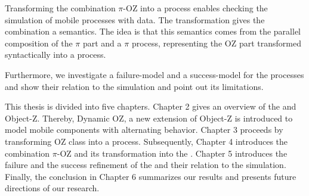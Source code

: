 Transforming the combination $\pi$-OZ into a \picalc{} process enables checking the simulation of mobile processes with data. The transformation gives the combination a \picalc{} semantics. The idea is that this semantics comes from the parallel composition of the $\pi$ part and a $\pi$ process, representing the OZ part transformed syntactically into a \picalc{} process.

 Furthermore, we investigate a failure-model and a success-model for the \picalc{} processes and show their relation to the simulation and point out its limitations.

This thesis is divided into five chapters. Chapter 2 gives an overview of the \picalc{} and Object-Z. Thereby, Dynamic OZ, a new extension of Object-Z is introduced to model mobile components with alternating behavior. Chapter 3 proceeds by transforming OZ class into a \picalc{} process. Subsequently, Chapter 4 introduces the combination $\pi$-OZ and its transformation into the \picalc{}. Chapter 5 introduces the failure and the success refinement of the \picalc{} and their relation to the simulation. Finally, the conclusion in Chapter 6 summarizes our results and presents future directions of our research.

